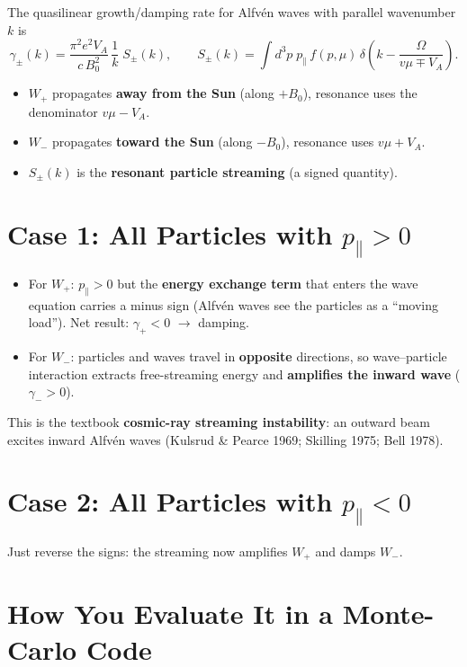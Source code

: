 The quasilinear growth/damping rate for Alfvén waves with parallel wavenumber $k$ is
\[
\boxed{
\gamma_\pm(k) = \frac{\pi^{2}e^{2}V_A}{c\,B_0^{2}}\,
\frac{1}{k}\;
S_\pm(k),
\qquad 
S_\pm(k) = \int d^{3}p\; p_\parallel\, f(p,\mu)\,
\delta\left(k - \frac{\Omega}{v\mu \mp V_A}\right).
}
\tag{1}
\]
\begin{itemize}
\item $W_{+}$ propagates \textbf{away from the Sun} (along $+B_0$), resonance uses the denominator $v\mu - V_A$.
\item $W_{-}$ propagates \textbf{toward the Sun} (along $-B_0$), resonance uses $v\mu + V_A$.
\item $S_\pm(k)$ is the \textbf{resonant particle streaming} (a signed quantity).
\end{itemize}

\section*{Case 1: All Particles with $p_\parallel>0$}

\begin{itemize}
\item For $W_{+}$: $p_\parallel > 0$ but the \textbf{energy exchange term} that enters the wave equation carries a minus sign (Alfvén waves see the particles as a “moving load”). Net result: $\boxed{\gamma_{+}<0}$ $\rightarrow$ damping.
\item For $W_{-}$: particles and waves travel in \textbf{opposite} directions, so wave–particle interaction extracts free-streaming energy and \textbf{amplifies the inward wave} ($\boxed{\gamma_{-}>0}$).
\end{itemize}

\noindent This is the textbook \textbf{cosmic-ray streaming instability}: an outward beam excites inward Alfvén waves (Kulsrud \& Pearce 1969; Skilling 1975; Bell 1978).

\section*{Case 2: All Particles with $p_\parallel<0$}

\noindent Just reverse the signs: the streaming now amplifies $W_{+}$ and damps $W_{-}$.

\section*{How You Evaluate It in a Monte-Carlo Code}

